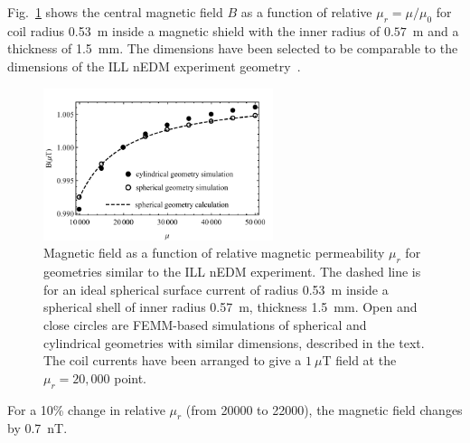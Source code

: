 
Fig.~\ref{fig:Magnetic_Field} shows the central magnetic field $B$ as
a function of relative $\mu_r=\mu/\mu_0$ for coil radius 0.53~m inside
a magnetic shield with the inner radius of $0.57$~m and a thickness of
1.5~mm.  The dimensions have been selected to be comparable to the
dimensions of the ILL nEDM experiment
geometry~\cite{bib:baker,bib:knecht}.
\begin{figure}[h!]
\begin{center}
   \includegraphics[width=0.6\textwidth]{femm_and_calcs.pdf}
    \caption{Magnetic field as a function of relative magnetic
      permeability $\mu_r$ for geometries similar to the ILL nEDM
      experiment.  The dashed line is for an ideal spherical surface
      current of radius 0.53~m inside a spherical shell of inner
      radius 0.57~m, thickness 1.5~mm.  Open and close circles are
      FEMM-based simulations of spherical and cylindrical geometries
      with similar dimensions, described in the text.  The coil
      currents have been arranged to give a $1~\mu$T field at the
      $\mu_r=20,000$ point.}
    \label{fig:Magnetic_Field}
    \end{center}
\end{figure} 
For a 10\% change in relative $\mu_r$ (from 20000 to 22000), the
magnetic field changes by 0.7~nT.



